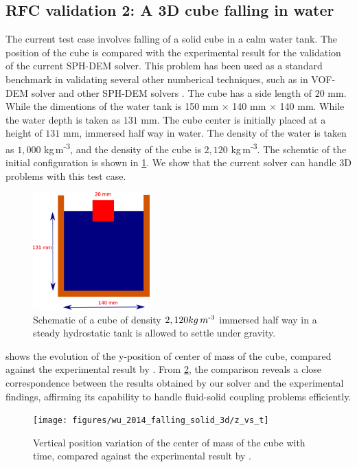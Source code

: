 \documentclass[preprint,12pt]{elsarticle}
\begin{document}
\FloatBarrier%
\subsection{RFC validation 2: A 3D cube falling in water}
\label{sec:rfc_validation_2_falling_solid_in_water}

The current test case involves falling of a solid cube in a calm water
tank. The position of the cube is compared with the
experimental\cite{wu2014two} result for the validation of the current SPH-DEM
solver. This problem has been used as a standard benchmark in validating
several other numberical techniques, such as in VOF-DEM solver
\cite{nan2022cfd} and other SPH-DEM solvers \cite{qiu20173d}. The cube has a
side length of $20$ mm. While the dimentions of the water tank is 150 mm
$\times$ 140 mm $\times$ 140 mm. While the water depth is taken as $131$ mm. The cube
center is initially placed at a height of $131$ mm, immersed half way in
water. The density of the water is taken as $1,000$ kg\,m\textsuperscript{-3},
and the density of the cube is $2,120$ kg\,m\textsuperscript{-3}. The schemtic
of the initial configuration is shown in \cref{fig:results_rfc_02_falling}. We
show that the current solver can handle 3D problems with this test case.
\begin{figure}[!htpb]
  \centering
  \includegraphics[width=0.4\textwidth]{images/rfc_02_falling_solid_in_water/schematic}
  \caption{Schematic of a cube of density $2,120 kg\,m\textsuperscript{-3}$
    immersed half way in a steady hydrostatic tank is allowed to settle under
    gravity.}
  \label{fig:results_rfc_02_falling}
\end{figure}



 shows the evolution of the y-position of
center of mass of the cube, compared against the experimental result by
\citet{wu2014two}. From \cref{fig:results_rfc_02_y_vs_t}, the comparison
reveals a close correspondence between the results obtained by our solver and
the experimental findings, affirming its capability to handle fluid-solid
coupling problems efficiently.
\begin{figure}[!htpb]
  \centering
  \texttt{[image: figures/wu\_2014\_falling\_solid\_3d/z\_vs\_t]}
  \caption{Vertical position variation of the center of mass of the cube with
    time, compared against the experimental result by \citet{wu2014two}.}
  \label{fig:results_rfc_02_y_vs_t}
\end{figure}
\end{document}

